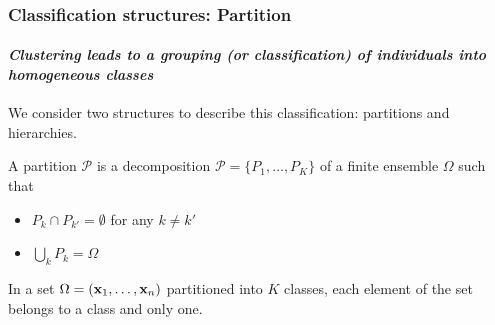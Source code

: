 \documentclass{beamer}\usepackage[]{graphicx}\usepackage[]{color}
\begin{document}
\begin{frame}
  \frametitle{Classification structures: Partition}

  \paragraph{\it Clustering leads to a grouping (or classification) of individuals into homogeneous classes} 
  \bigskip
  
  We consider two structures to describe this classification: \alert{partitions} and \alert{hierarchies}.

  \vfill

  \begin{definition}[Partition]
    A partition $\mathcal{P}$ is a decomposition $\mathcal{P} = \{P_1,\dots,P_K\}$ of a finite ensemble $\Omega$ such that
    \begin{itemize}
      \item $P_k \cap P_{k'} = \emptyset$ for any $k\neq k'$
      \item $\bigcup_{k} P_k = \Omega$
    \end{itemize}
    In a set $\Omega = (\mathbf{x}_1, \dots, \mathbf{x}_n)$ partitioned into $K$ classes, each element of the set belongs to a
class and only one.
  \end{definition}

\end{frame}
\end{document}
